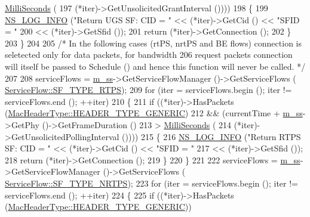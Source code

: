 \begin{DoxyCode}
      \hyperlink{group__timecivil_gaf26127cf4571146b83a92ee18679c7a9}{MilliSeconds} (
197                                        (*iter)->GetUnsolicitedGrantInterval ())))
198         \{
199           \hyperlink{group__logging_gafbd73ee2cf9f26b319f49086d8e860fb}{NS\_LOG\_INFO} (\textcolor{stringliteral}{"Return UGS SF: CID = "} << (*iter)->GetCid () << \textcolor{stringliteral}{"SFID = "}
200                                                << (*iter)->GetSfid ());
201           \textcolor{keywordflow}{return} (*iter)->GetConnection ();
202         \}
203     \}
204 
205   \textcolor{comment}{/* In the following cases (rtPS, nrtPS and BE flows) connection is seletected only for data packets, for
       bandwidth}
206 \textcolor{comment}{   request packets connection will itself be passed to Schedule () and hence this function will never be
       called. */}
207 
208   serviceFlows = \hyperlink{classns3_1_1SSScheduler_a9a0b3cae20f18593e3d150e7534ce678}{m\_ss}->GetServiceFlowManager ()->GetServiceFlows (
      \hyperlink{classns3_1_1ServiceFlow_a7990ba10be1e098328fd1e6382a26235a0e98ff713b932a029acad7e5b24bbf55}{ServiceFlow::SF\_TYPE\_RTPS});
209   \textcolor{keywordflow}{for} (iter = serviceFlows.begin (); iter != serviceFlows.end (); ++iter)
210     \{
211       \textcolor{keywordflow}{if} ((*iter)->HasPackets (\hyperlink{classns3_1_1MacHeaderType_a54d8fc8bc93a2b7865627965cdd31c20a48fe5b2f20cadf78008c71469b518403}{MacHeaderType::HEADER\_TYPE\_GENERIC})
212           && (currentTime + \hyperlink{classns3_1_1SSScheduler_a9a0b3cae20f18593e3d150e7534ce678}{m\_ss}->GetPhy ()->GetFrameDuration ()
213               > \hyperlink{group__timecivil_gaf26127cf4571146b83a92ee18679c7a9}{MilliSeconds} (
214                 (*iter)->GetUnsolicitedPollingInterval ())))
215         \{
216           \hyperlink{group__logging_gafbd73ee2cf9f26b319f49086d8e860fb}{NS\_LOG\_INFO} (\textcolor{stringliteral}{"Return RTPS SF: CID = "} << (*iter)->GetCid () << \textcolor{stringliteral}{"SFID = "}
217                                                 << (*iter)->GetSfid ());
218           \textcolor{keywordflow}{return} (*iter)->GetConnection ();
219         \}
220     \}
221 
222   serviceFlows = \hyperlink{classns3_1_1SSScheduler_a9a0b3cae20f18593e3d150e7534ce678}{m\_ss}->GetServiceFlowManager ()->GetServiceFlows (
      \hyperlink{classns3_1_1ServiceFlow_a7990ba10be1e098328fd1e6382a26235a7f8577f851a9f01d159442a3a3fcdf48}{ServiceFlow::SF\_TYPE\_NRTPS});
223   \textcolor{keywordflow}{for} (iter = serviceFlows.begin (); iter != serviceFlows.end (); ++iter)
224     \{
225       \textcolor{keywordflow}{if} ((*iter)->HasPackets (\hyperlink{classns3_1_1MacHeaderType_a54d8fc8bc93a2b7865627965cdd31c20a48fe5b2f20cadf78008c71469b518403}{MacHeaderType::HEADER\_TYPE\_GENERIC}))

\end{DoxyCode}
